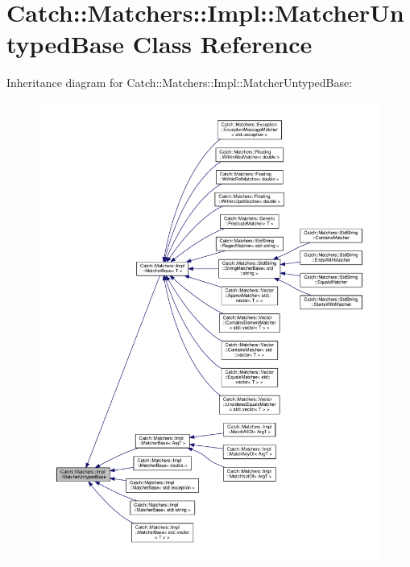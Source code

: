 \hypertarget{classCatch_1_1Matchers_1_1Impl_1_1MatcherUntypedBase}{}\section{Catch\+:\+:Matchers\+:\+:Impl\+:\+:Matcher\+Untyped\+Base Class Reference}
\label{classCatch_1_1Matchers_1_1Impl_1_1MatcherUntypedBase}


Inheritance diagram for Catch\+:\+:Matchers\+:\+:Impl\+:\+:Matcher\+Untyped\+Base\+:
\nopagebreak
\begin{figure}[H]
\begin{center}
\leavevmode
\includegraphics[width=350pt]{classCatch_1_1Matchers_1_1Impl_1_1MatcherUntypedBase__inherit__graph}
\end{center}
\end{figure}
